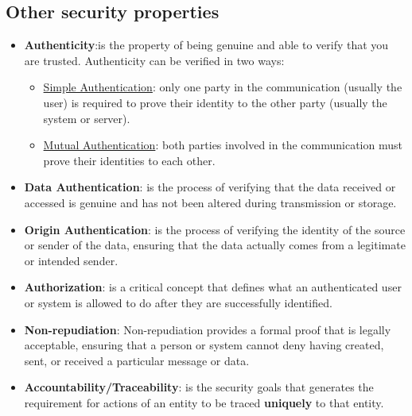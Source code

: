 \subsection{Other security properties}
\begin{itemize}
    \item \textbf{Authenticity}:is the property of being genuine and able to verify that you are trusted. Authenticity can be verified in two ways:
    \begin{itemize}
            \item \underline{Simple Authentication}: only one party in the communication (usually the user) is required to prove their identity to the other party (usually the system or server).
            \item \underline{Mutual Authentication}: both parties involved in the communication must prove their identities to each other. 
    \end{itemize} 
    \item \textbf{Data Authentication}: is the process of verifying that the data received or accessed is genuine and has not been altered during transmission or storage.
    \item \textbf{Origin Authentication}: is the process of verifying the identity of the source or sender of the data, ensuring that the data actually comes from a legitimate or intended sender.
    \item \textbf{Authorization}: is a critical concept that defines what an authenticated user or system is allowed to do after they are successfully identified.
    \item \textbf{Non-repudiation}: Non-repudiation provides a formal proof that is legally acceptable, ensuring that a person or system cannot deny having created, sent, or received a particular message or data.
    \item \textbf{Accountability/Traceability}: is the security goals that generates the requirement for actions of an entity to be traced \textbf{uniquely} to that entity.
\end{itemize}
\newpage

